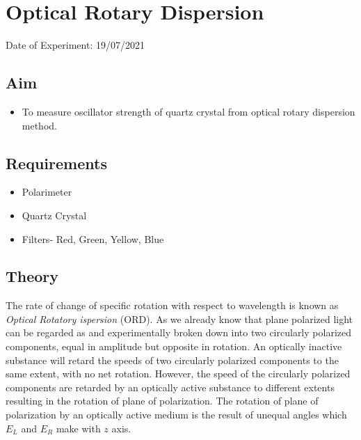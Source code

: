 


	
	\chapter{Optical Rotary Dispersion} %
	\vspace{-1cm}
	
	\begin{center}%
		Date of Experiment: 19/07/2021
	\end{center}
	
	
	\section{Aim}
	\begin{itemize}
		\item To measure oscillator strength of quartz crystal from optical rotary dispersion method.
	\end{itemize}
	
	\section{Requirements}
	\begin{itemize}
		\item 	Polarimeter
		\item 	Quartz Crystal
		\item   Filters- Red, Green, Yellow, Blue
	\end{itemize}
	
	\section{Theory}
	
	The rate of change of specific rotation with respect to wavelength is known as \emph{Optical Rotatory ispersion} (ORD). As we already know that plane polarized light can be regarded as and experimentally broken down into two circularly polarized components, equal in amplitude but opposite in rotation. An optically inactive substance will retard the speeds of two circularly polarized components to the same extent, with no net rotation. However, the speed of the circularly polarized components are retarded by an optically active substance to different extents resulting in the rotation of plane of polarization. The rotation of plane of polarization by an optically active medium is the result of unequal angles which $E_L$ and $E_R$ make with $z$ axis.
	
